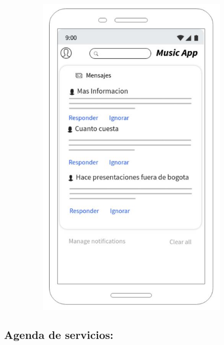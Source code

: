 \begin{figure}[hbt!]
 \centering
\includegraphics[width=12cm, height=16cm,keepaspectratio=true]{Desarrollo/Interfaces/imgs/wire4.JPG}
\end{figure}
\newpage
\subsection{Agenda de servicios:}

